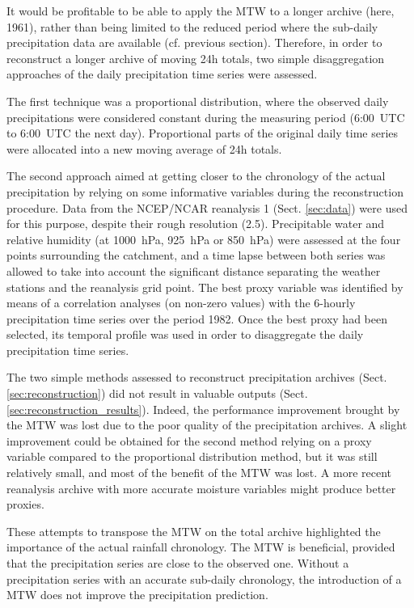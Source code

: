 \documentclass[hess, manuscript]{copernicus}
\begin{document}
	It would be profitable to be able to apply the MTW to a longer archive (here, 1961), rather than being limited to the reduced period where the sub-daily precipitation data are available (cf. previous section). Therefore, in order to reconstruct a longer archive of moving 24h totals, two simple disaggregation approaches of the daily precipitation time series were assessed.
	
	The first technique was a proportional distribution, where the observed daily precipitations were considered constant during the measuring period (6:00~UTC to 6:00~UTC the next day). Proportional parts of the original daily time series were allocated into a new moving average of 24h totals. 
	
	The second approach aimed at getting closer to the chronology of the actual precipitation by relying on some informative variables during the reconstruction procedure. Data from the NCEP/NCAR reanalysis 1 (Sect. \ref{sec:data}) were used for this purpose, despite their rough resolution (2.5\textdegree). Precipitable water and relative humidity (at 1000~hPa, 925~hPa or 850~hPa) were assessed at the four points surrounding the catchment, and a time lapse between both series was allowed to take into account the significant distance separating the weather stations and the reanalysis grid point. The best proxy variable was identified by means of a correlation analyses (on non-zero values) with the 6-hourly precipitation time series over the period 1982. Once the best proxy had been selected, its temporal profile was used in order to disaggregate the daily precipitation time series.




	
	The two simple methods assessed to reconstruct precipitation archives (Sect. \ref{sec:reconstruction}) did not result in valuable outputs (Sect. \ref{sec:reconstruction_results}). Indeed, the performance improvement brought by the MTW was lost due to the poor quality of the precipitation archives. A slight improvement could be obtained for the second method relying on a proxy variable compared to the proportional distribution method, but it was still relatively small, and most of the benefit of the MTW was lost. A more recent reanalysis archive with more accurate moisture variables might produce better proxies.
	
	These attempts to transpose the MTW on the total archive highlighted the importance of the actual rainfall chronology. The MTW is beneficial, provided that the precipitation series are close to the observed one. Without a precipitation series with an accurate sub-daily chronology, the introduction of a MTW does not improve the precipitation prediction.
	
\end{document}
